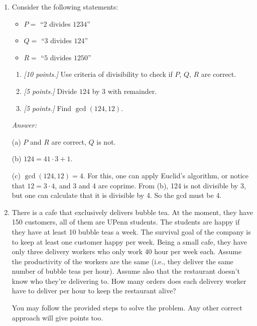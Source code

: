 \documentclass[12pt]{amsart}
\begin{document}
\begin{enumerate}[label=\arabic*.,itemsep=10pt, leftmargin=*]
    \item 
        Consider the following statements:
        \begin{itemize}
            \item $P=$ ``$2$ divides $1234$''
            \item $Q =$ ``$3$ divides $124$''
            \item $R=$ ``$5$ divides $1250$''
        \end{itemize}
        \begin{enumerate}
        \item
        \textit{[10 points.]}
        Use criteria of divisibility to check if $P$, $Q$, $R$ are correct.
        \item
        \textit{[5 points.]}
        Divide $124$ by $3$ with remainder.
        \item
        \textit{[5 points.]}
        Find $\gcd(124,12)$.
        \end{enumerate}
        
    \textit{Answer:}
    
    (a) $P$ and $R$ are correct, $Q$ is not.
    
    (b) $124 = 41\cdot 3 + 1$.
    
    (c) $\gcd(124,12) = 4$. For this, one can apply Euclid's algorithm, or notice that $12 = 3 \cdot 4$, and 3 and 4 are coprime. From (b), 124 is not divisible by 3, but one can calculate that it is divisible by 4. So the gcd must be 4.  
        
        
        
    \item 
        There is a cafe that exclusively delivers bubble tea.
        At the moment, they have 150 customers, all of them are UPenn students.
        The students are happy if they have at least 10 bubble teas a week.
        The survival goal of the company is to keep at least one customer happy per week.
        Being a small cafe, they have only three delivery workers who only work 40 hour per week each.
        Assume the productivity of the workers are the same (i.e., they deliver the same number of bubble teas per hour).
        Assume also that the restaurant doesn't know who they're delivering to.
        How many orders does each delivery worker have to deliver per hour to keep the restaurant alive? 
        
        You may follow the provided steps to solve the problem. Any other correct approach will give points too.
        

\end{enumerate}
\end{document}
